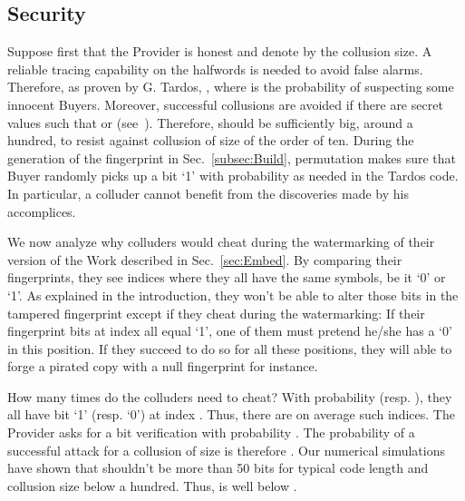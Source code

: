 \documentclass{article}
\begin{document}
\subsection{Security}
Suppose first that the Provider is honest and denote by  the
collusion size. A reliable tracing capability on the halfwords is
needed to avoid false alarms. Therefore, as proven by G. Tardos, , where  is the probability of suspecting
some innocent Buyers. Moreover, successful collusions are avoided if
there are secret values such that  or
(see~\cite{Furon2009:Worst}).  Therefore,  should be
sufficiently big, around a hundred, to resist against collusion of size
of the order of ten. 
During the generation of the fingerprint in
Sec.~\ref{subsec:Build}, permutation  makes sure that Buyer
 randomly picks up a bit `1' with probability  as
needed in the Tardos code. In particular, a colluder cannot benefit
from the discoveries made by his accomplices.

We now analyze why colluders would cheat during the watermarking
of their version of the Work described in Sec.~\ref{sec:Embed}.
By comparing their fingerprints, they see indices where they all have the same symbols,
be it `0' or `1'. As explained in the introduction, they won't be able to alter those bits in the tampered fingerprint except if they cheat during the watermarking: 
If their fingerprint bits at index  all equal `1', one of them must pretend he/she has a `0' in this position. If they succeed to do so for all these positions, they will able to forge a pirated copy with a null fingerprint for instance. 

How many times do the colluders need to cheat?
With probability  (resp. ), they all have bit `1'
(resp. `0') at index . Thus, there are on average  such indices. The Provider asks for a bit verification with probability . The probability of a
successful attack for a collusion of size  is therefore
.
Our numerical simulations have shown that  shouldn't be more than 50 bits for typical code length and collusion size below a hundred. Thus,  is well below . 
\end{document}
